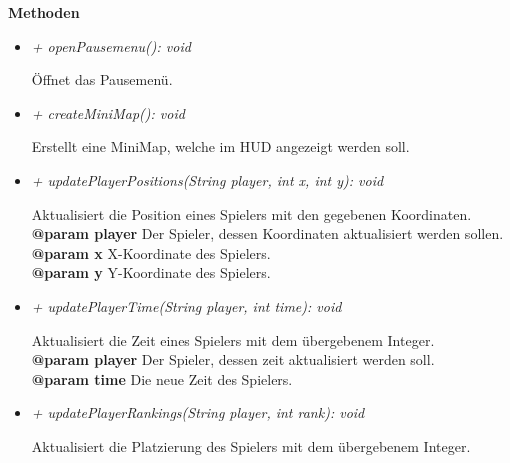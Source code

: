             \textbf{Methoden}					
            \begin{itemize}
                \item  \textit{+ openPausemenu(): void} 
                    \begin{leftbar}[0.9\linewidth]
                        Öffnet das Pausemenü.\\
                    \end{leftbar}
                \item  \textit{+ createMiniMap(): void} 
                    \begin{leftbar}[0.9\linewidth]
                        Erstellt eine MiniMap, welche im HUD angezeigt werden soll.\\
                    \end{leftbar}
                    \pagebreak
                \item  \textit{+ updatePlayerPositions(String player, int x, int y): void} 
                    \begin{leftbar}[0.9\linewidth]
                        Aktualisiert die Position eines Spielers mit den gegebenen Koordinaten.\\
                        \textbf{@param player} Der Spieler, dessen Koordinaten aktualisiert
                        werden sollen.\\
                        \textbf{@param x} X-Koordinate des Spielers.\\
                        \textbf{@param y} Y-Koordinate des Spielers.\\
                    \end{leftbar}
                \item  \textit{+ updatePlayerTime(String player, int time): void} 
                    \begin{leftbar}[0.9\linewidth]
                        Aktualisiert die Zeit eines Spielers mit dem übergebenem Integer.\\
                        \textbf{@param player} Der Spieler, dessen zeit aktualisiert werden soll.\\
                        \textbf{@param time} Die neue Zeit des Spielers.\\
                    \end{leftbar}
                \item  \textit{+ updatePlayerRankings(String player, int rank): void} 
                    \begin{leftbar}[0.9\linewidth]
                        Aktualisiert die Platzierung des Spielers mit dem übergebenem Integer.\\

\end{leftbar}
\end{itemize}
